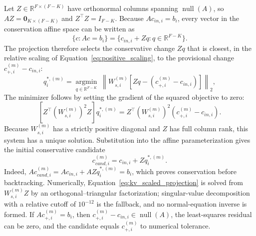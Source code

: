 \documentclass[a4paper,fleqn]{cas-sc}
\begin{document}
Let $Z\in\mathbb{R}^{F\times(F-K)}$ have orthonormal columns spanning $\operatorname{null}(A)$, so $AZ=\mathbf{0}_{K\times(F-K)}$ and $Z^\top Z=I_{F-K}$. Because $Ac_{in,i}=b_i$, every vector in the conservation affine space can be written as
\begin{equation}
\label{eq:conservative_parameterization}
\{c:Ac=b_i\}
=\{c_{in,i}+Zq:q\in\mathbb{R}^{F-K}\}.
\end{equation}
The projection therefore selects the conservative change $Zq$ that is closest, in the relative scaling of Equation~\eqref{eq:positive_scaling}, to the provisional change $c_{+,i}^{(m)}-c_{in,i}$:
\begin{equation}
\label{eq:kv_scaled_projection}
q_i^{*,(m)}=\underset{q\in\mathbb{R}^{F-K}}{\operatorname{argmin}}\;
\left\|W_{s,i}^{(m)}\left[Zq-\left(c_{+,i}^{(m)}-c_{in,i}\right)\right]\right\|_2,
\end{equation}
The minimizer follows by setting the gradient of the squared objective to zero:
\begin{equation}
\label{eq:kv_optimality}
\left[Z^\top\!\left(W_{s,i}^{(m)}\right)^2Z\right]q_i^{*,(m)}
=Z^\top\!\left(W_{s,i}^{(m)}\right)^2
\left(c_{+,i}^{(m)}-c_{in,i}\right).
\end{equation}
Because $W_{s,i}^{(m)}$ has a strictly positive diagonal and $Z$ has full column rank, this system has a unique solution. Substitution into the affine parameterization gives the initial conservative candidate
\begin{equation}
\label{eq:conservative_candidate}
c_{cand,i}^{(m)}=c_{in,i}+Zq_i^{*,(m)}.
\end{equation}
Indeed, $Ac_{cand,i}^{(m)}=Ac_{in,i}+AZq_i^{*,(m)}=b_i$, which proves conservation before backtracking. Numerically, Equation~\eqref{eq:kv_scaled_projection} is solved from $W_{s,i}^{(m)}Z$ by an orthogonal--triangular factorization; singular-value decomposition with a relative cutoff of $10^{-12}$ is the fallback, and no normal-equation inverse is formed. If $Ac_{+,i}^{(m)}=b_i$, then $c_{+,i}^{(m)}-c_{in,i}\in\operatorname{null}(A)$, the least-squares residual can be zero, and the candidate equals $c_{+,i}^{(m)}$ to numerical tolerance.
\end{document}
